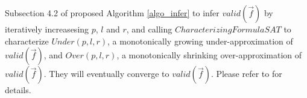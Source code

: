 \documentclass[conference]{IEEEtran}
\begin{document}
Subsection 4.2 of \cite{QinTODAES15} proposed Algorithm \ref{algo_infer} to infer $valid(\vec{f})$ by iteratively increasesing $p$, $l$ and $r$,
and calling $CharacterizingFormulaSAT$ to characterize $Under(p,l,r)$,
a monotonically growing under-approximation of $valid(\vec{f})$,
and $Over(p,l,r)$,
a monotonically shrinking over-approximation of $valid(\vec{f})$.
They will eventually converge to $valid(\vec{f})$.
Please refer to \cite{QinTODAES15} for details.
% 
% 
% 
% 
% 
% 
% 
\end{document}
